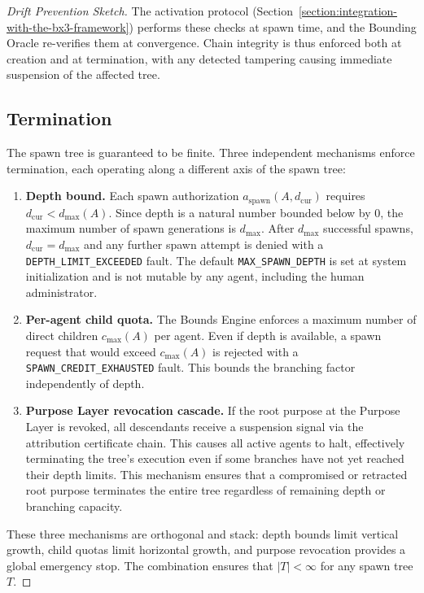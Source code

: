 \begin{proof}[Drift Prevention Sketch]
The activation protocol (Section~\ref{section:integration-with-the-bx3-framework}) performs these checks at spawn time, and the Bounding Oracle re-verifies them at convergence. Chain integrity is thus enforced both at creation and at termination, with any detected tampering causing immediate suspension of the affected tree.

\subsection{Termination}

The spawn tree is guaranteed to be finite. Three independent mechanisms enforce termination, each operating along a different axis of the spawn tree:

\begin{enumerate}
    \item \textbf{Depth bound.} Each spawn authorization $a_{\text{spawn}}(A, d_{\text{cur}})$ requires $d_{\text{cur}} < d_{\max}(A)$. Since depth is a natural number bounded below by $0$, the maximum number of spawn generations is $d_{\max}$. After $d_{\max}$ successful spawns, $d_{\text{cur}} = d_{\max}$ and any further spawn attempt is denied with a \texttt{DEPTH\_LIMIT\_EXCEEDED} fault. The default \texttt{MAX\_SPAWN\_DEPTH} is set at system initialization and is not mutable by any agent, including the human administrator.

    \item \textbf{Per-agent child quota.} The Bounds Engine enforces a maximum number of direct children $c_{\max}(A)$ per agent. Even if depth is available, a spawn request that would exceed $c_{\max}(A)$ is rejected with a \texttt{SPAWN\_CREDIT\_EXHAUSTED} fault. This bounds the branching factor independently of depth.

    \item \textbf{Purpose Layer revocation cascade.} If the root purpose at the Purpose Layer is revoked, all descendants receive a suspension signal via the attribution certificate chain. This causes all active agents to halt, effectively terminating the tree's execution even if some branches have not yet reached their depth limits. This mechanism ensures that a compromised or retracted root purpose terminates the entire tree regardless of remaining depth or branching capacity.
\end{enumerate}

These three mechanisms are orthogonal and stack: depth bounds limit vertical growth, child quotas limit horizontal growth, and purpose revocation provides a global emergency stop. The combination ensures that $|T| < \infty$ for any spawn tree $T$.


\end{proof}
